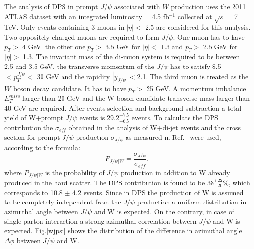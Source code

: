 \documentclass{ws-rv9x6}
\begin{document}
The analysis of DPS in prompt $J/\psi$ associated with $W$ production \cite{dps2} uses the 2011 ATLAS dataset with an integrated luminosity = 4.5 fb$^{-1}$ collected at $\sqrt{s}$ = 7 TeV.
Only events containing 3 muons in $|\eta| < $ 2.5 are considered for this analysis. Two oppositely charged muons are required to form $J/\psi$. One muon has to have $p_T > $ 4 GeV, the other one $p_T >$ 3.5 GeV for $|\eta| <$ 1.3 and $p_T >$ 2.5 GeV for $|\eta| >$ 1.3. The invariant mass of the di-muon system is required to be between 2.5 and 3.5 GeV, the transverse momentum of the $J/\psi$ has to satisfy 8.5 $ < p_T^{J/\psi} < $ 30 GeV and the rapidity $ |y_{J/\psi}| < $2.1. 
The third muon is treated as the $W$ boson decay candidate. It has to have $p_T > $ 25 GeV. A momentum imbalance $E_T^{miss}$ larger than 20 GeV and the W boson candidate transverse mass larger than 40 GeV are required.
After events selection and background subtraction a total yield of W+prompt $J/\psi$ events is 29.2$^{+7.5}_{-6.5}$ events.
To calculate the DPS contribution the $\sigma_{e\!f\!f}$ obtained in the analysis of W+di-jet events  and the cross section for prompt $J/\psi$ production $\sigma_{J/\psi}$ as measured in Ref.~ were used, according to the formula:
\begin{equation}
P_{J/\psi|W} = \frac{\sigma_{J/\psi}}{\sigma_{e\!f\!f}},
\label{formula}
 \end{equation} where $P_{J/\psi|W}$ is the probability of $J/\psi$ production in addition to W already produced in the hard scatter. The DPS contribution is found to be 38$^{+22}_{-20}$\%, which corresponds to  10.8 $\pm$ 4.2 events. Since in DPS the production of W is assumed to be completely independent from the $J/\psi$ production a uniform distribution in azimuthal angle between $J/\psi$ and W is expected. On the contrary, in case of single parton interaction a strong azimuthal correlation  between $J/\psi$ and W is expected. Fig.\ref{wjpsi} shows the distribution of the difference in azimuthal angle $\Delta\phi$ between $J/\psi$ and W.
\begin{figure}[ht] 
\centerline{
\hspace*{4pt} 
} 
\end{figure}
\end{document}
